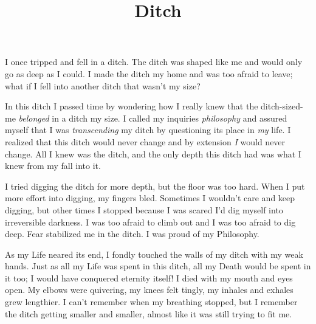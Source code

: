 \documentclass{article}
\title{Ditch}
\begin{document}
 \newline

I once tripped and fell in a ditch. The ditch was shaped like me and
would only go as deep as I could. I made the ditch my home and was too
afraid to leave; what if I fell into another ditch that wasn't my size?
\newline
\newline


In this ditch I passed time by wondering how I really knew that the
ditch-sized-me \textit{belonged} in a ditch my size. I called my
inquiries \textit{philosophy} and assured myself that I was
\textit{transcending} my ditch by questioning its place in \textit{my}
life. I realized that this ditch would never change and by extension
\textit{I} would never change. All I knew was the ditch, and the only
depth this ditch had was what I knew from my fall into it. 
\newline
\newline


I tried digging the ditch for more depth, but the floor was too hard.
When I put more effort into digging, my fingers bled. Sometimes
I wouldn't care and keep digging, but other times I stopped because
I was scared I'd dig myself into irreversible darkness. I was too afraid
to climb out and I was too afraid to dig deep. Fear stabilized me in the
ditch. I was proud of my Philosophy. 
\newline
\newline


As my Life neared its end, I fondly touched the walls of my ditch with
my weak hands. Just as all my Life was spent in this ditch, all my Death
would be spent in it too; I would have conquered eternity itself! I died
with my mouth and eyes open. My elbows were quivering, my knees felt
tingly, my inhales and exhales grew lengthier. I can't remember when my
breathing stopped, but I remember the ditch getting smaller and smaller,
almost like it was still trying to fit me. \newline
\end{document}
